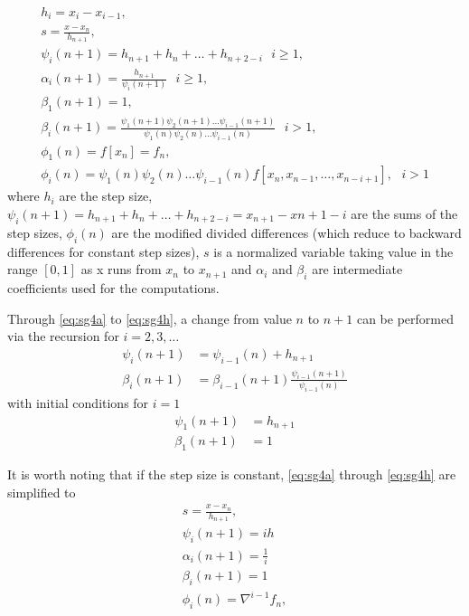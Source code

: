 \begin{gather}
  h_i  = x_i - x_{i-1}, \label{eq:sg4a}\\
  s    = \frac{x - x_n}{h_{n+1}}, \label{eq:sg4b}\\
  \psi _i (n+1)   = h_{n+1} + h_{n} + \dots + h_{n+2-i} \text{ } i \ge 1, \label{eq:sg4c}\\
  \alpha _i (n+1) = \frac{h_{n+1}}{\psi _i (n+1)} \text{ } i \ge 1, \label{eq:sg4d}\\
  \beta _1 (n+1)  = 1, \label{eq:sg4e}\\
  \beta _i (n+1)  = \frac{\psi _1 (n+1) \psi _2 (n+1) \dots \psi _{i-1}(n+1)}{\psi _1 (n) \psi _2 (n) \dots \psi _{i-1}(n)} \text{ } i > 1, \label{eq:sg4f}\\
  \phi _1(n) = f[x_n] = f_n, \label{eq:sg4g}\\
  \phi _i(n) = \psi _1 (n) \psi _2 (n) \dots \psi _{i-1}(n) f[x_n,x_{n-1},\dots ,x_{n-i+1}], \text{ } i > 1 \label{eq:sg4h}
\end{gather}
where $h_i$ are the step size, 
$\psi _i(n+1) = h_{n+1} + h_{n} + \dots + h_{n+2-i} = x_{n+1}-x{n+1-i}$ are the 
sums of the step sizes, $\phi _{i}(n)$ are the modified divided differences (which 
reduce to backward differences for constant step sizes), $s$ is a normalized variable 
taking value in the range $[0,1]$ as x runs from $x_n$ to $x_{n+1}$ and $\alpha _i$ 
and $\beta _i$ are intermediate coefficients used for the computations.

Through \autoref{eq:sg4a} to \autoref{eq:sg4h}, a change from value $n$ to $n+1$ 
can be performed via the recursion for $i=2,3,\dots$
\begin{equation}
  \begin{aligned}
    \psi _i(n+1)   &= \psi _{i-1}(n) + h_{n+1} \\
    \beta _i(n+1)  &= \beta _{i-1}(n+1) \frac{\psi _{i-1}(n+1)}{\psi _{i-1}(n)}
  \end{aligned}
\end{equation}
with initial conditions for $i=1$
\begin{equation}
  \begin{aligned}
    \psi _1(n+1)   &= h_{n+1} \\
    \beta _1(n+1)  &= 1
  \end{aligned}
\end{equation}

It is worth noting that if the step size is constant, \autoref{eq:sg4a} through 
\autoref{eq:sg4h} are simplified to
\begin{gather}
  s = \frac{x-x_n}{h_{n+1}} , \label{eq:sg4Ab}\\
  \psi _i (n+1)   = ih \label{eq:sg4Ac}\\
  \alpha _i (n+1) = \frac{1}{i} \label{eq:sg4Ad}\\
  \beta_i (n+1)   = 1 \label{eq:sg4Ae}\\
  \phi _i(n)      = \nabla ^{i-1} f_n, \label{eq:sg4g}
\end{gather}

